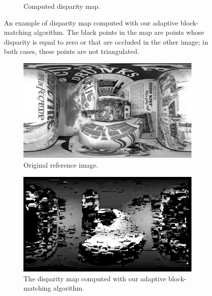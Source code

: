 \begin{figure}[h]
\begin{subfigure}{0.7\linewidth}
		\caption{Computed disparity map.}
	\end{subfigure}
\caption{An example of disparity map computed with our adaptive block-matching
algorithm. The black points in the map are points whose disparity is equal to
zero or that are occluded in the other image; in both cases, these points are
not triangulated.}
\label{fig:llDisparity}
\end{figure}
%
\begin{figure}[h]
\centering
	\begin{subfigure}{0.7\linewidth}
		\centering
		\includegraphics[width=\linewidth]{img/original.png}
		\caption{Original reference image.}
	\end{subfigure}
	\begin{subfigure}{0.7\linewidth}
		\centering
		\includegraphics[width=\linewidth]{img/our_disparity.png}
		\caption{The disparity map computed with our adaptive block-matching
		algorithm.}
	\end{subfigure}
	\begin{subfigure}{0.7\linewidth}
		\centering

\end{subfigure}
\end{figure}

